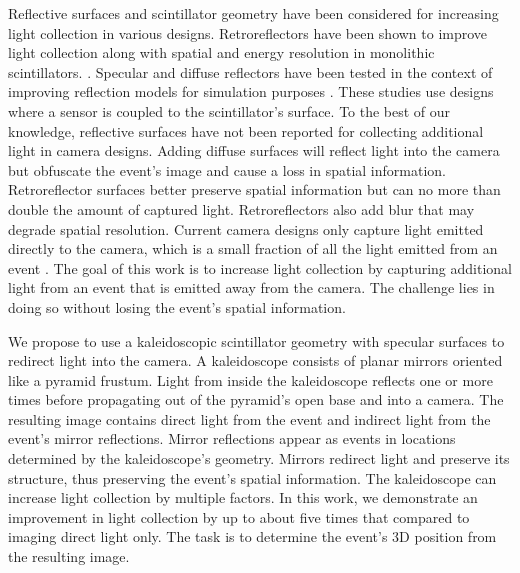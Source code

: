 Reflective surfaces and scintillator geometry have been considered for increasing 
light collection in various designs.
Retroreflectors have been shown to improve light collection along with spatial 
and energy resolution in monolithic scintillators.  \cite{mcelroy2002use,heemskerk2009micro,ros2014retroreflector,gonzalez2017performance}.
Specular and diffuse reflectors have been tested in the context of improving 
reflection models for simulation purposes \cite{janecek2010simulating,roncali2017integrated,trigila2021optimization}.
These studies use designs where a sensor is coupled to the scintillator's surface.
To the best of our knowledge, reflective surfaces have not been reported for 
collecting additional light in camera designs.
Adding diffuse surfaces will reflect light into the camera but obfuscate the 
event's image and cause a loss in spatial information.
Retroreflector surfaces better preserve spatial information but can no more than 
double the amount of captured light.
Retroreflectors also add blur that may degrade spatial resolution.
Current camera designs only capture light emitted directly to the camera,
which is a small fraction of all the light emitted from an event 
\cite{bocchieri2024scintillation, yamamoto2023development, d2021novel, gao2023novel, losko2021new,adams2017gamma,balasubramanian2022x,gustschin2024event}.
The goal of this work is to increase light collection by capturing additional 
light from an event that is emitted away from the camera.
The challenge lies in doing so without losing the event's spatial information.

We propose to use a kaleidoscopic scintillator geometry with specular surfaces to 
redirect light into the camera.
A kaleidoscope consists of planar mirrors oriented like a pyramid frustum.
Light from inside the kaleidoscope reflects one or more times before 
propagating out of the pyramid's open base and into a camera.
The resulting image contains direct light from the event and indirect light from 
the event's mirror reflections. 
Mirror reflections appear as events in locations determined by the kaleidoscope's geometry.
Mirrors redirect light and preserve its structure, thus preserving the event's 
spatial information.
The kaleidoscope can increase light collection by multiple factors.
In this work, we demonstrate an improvement in light collection by up to about 
five times that compared to imaging direct light only.
The task is to determine the event's 3D position from the resulting image.


